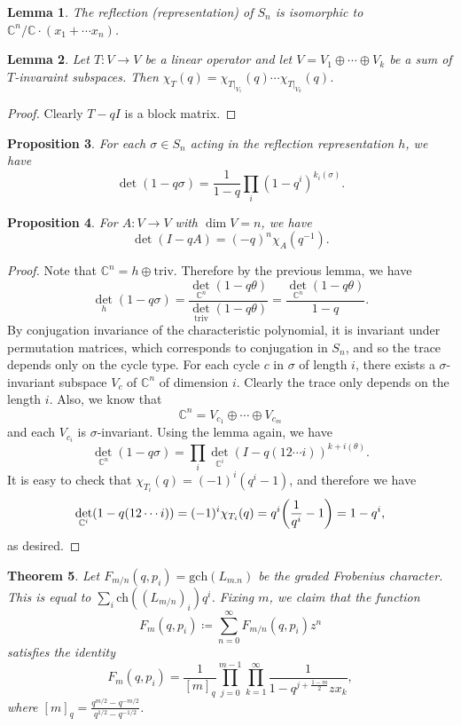 \documentclass[leqno, openany]{memoir}
\newtheorem{thm}{Theorem}[section]
\newtheorem{prop}[thm]{Proposition}
\newtheorem{lem}[thm]{Lemma}
\theoremstyle{definition}
\theoremstyle{remark}
\theoremstyle{plain}
\theoremstyle{definition}
\theoremstyle{remark}
\newcommand{\C}{\mathbb{C}}
\newcommand{\mr}[1]{\mathrm{#1}}
\newcommand{\1}{\mathbf{1}}
\newcommand{\2}{\mathbf{2}}
\newcommand{\3}{\mathbf{3}}
\begin{document}
\begin{lem}
    The reflection (representation) of $S_n$ is isomorphic to $\C^n / \C \cdot (x_1 + \cdots x_n)$.
\end{lem}

\begin{lem}
    Let $T \colon V \to V$ be a linear operator and let $V = V_1 \oplus \cdots \oplus V_k$ be a sum of $T$-invaraint subspaces. Then $\chi_T(q) = \chi_{T|_{V_1}}(q) \cdots \chi_{T|_{V_k}}(q)$.
\end{lem}

\begin{proof}
    Clearly $T - qI$ is a block matrix.
\end{proof}

\begin{prop}
    For each $\sigma \in S_n$ acting in the reflection representation $h$, we have
    \[ \det(1-q \sigma) = \frac{1}{1-q} \prod_i (1-q^i)^{k_i(\sigma)}. \]
\end{prop}

\begin{prop}
    For $A \colon V \to V$ with $\dim V = n$, we have
    \[ \det(I - qA) = (-q)^n \chi_A(q^{-1}). \]
\end{prop}

\begin{proof}
    Note that $\C^n = h \oplus \mr{triv}$. Therefore by the previous lemma, we have
    \[ \det_h(1-q \sigma) = \frac{\det_{\C^n} (1-q\theta)}{\det_{\mr{triv}}(1-q \theta)} = \frac{\det_{\C^n}(1-q\theta)}{1-q}. \]
    By conjugation invariance of the characteristic polynomial, it is invariant under permutation matrices, which corresponds to conjugation in $S_n$, and so the trace depends only on the cycle type. For each cycle $c$ in $\sigma$ of length $i$, there exists a $\sigma$-invariant subspace $V_c$ of $\C^n$ of dimension $i$. Clearly the trace only depends on the length $i$. Also, we know that
    \[ \C^n = V_{c_1} \oplus \cdots \oplus V_{c_m} \]
    and each $V_{c_i}$ is $\sigma$-invariant. Using the lemma again, we have
    \[ \det_{\C^n} (1-q \sigma) = \prod_i \det_{\C^i} (I - q (1 2 \cdots i))^{k+i(\theta)}. \]
    It is easy to check that $\chi_{T_i}(q) = {(-1)}^i (q^i - 1)$, and therefore we have
    \[ \det_{\C^i}(1-q (1 2 \cdots i)) = (-1)^i \chi_{T_i}(q) = q^i \qty(\frac{1}{q^i} - 1) = 1-q^i, \]
    as desired.
\end{proof}

\begin{thm}
    Let $F_{m/n}(q, p_i) = \mr{gch}(L_{m.n})$ be the graded Frobenius character. This is equal to $\sum_i \mr{ch}((L_{m/n})_i) q^i$. Fixing $m$, we claim that the function
    \[ F_m(q, p_i) \coloneqq \sum_{n=0}^{\infty} F_{m/n}(q, p_i) z^n \]
    satisfies the identity
    \[ F_m(q, p_i) = \frac{1}{[m]_q} \prod_{j=0}^{m-1} \prod_{k=1}^{\infty} \frac{1}{1- q^{j+\frac{1-m}{2}} z x_k}, \]
    where $[m]_q = \frac{q^{m/2} - q^{-m/2}}{q^{1/2} - q^{-1/2}}$.
\end{thm}
\end{document}
